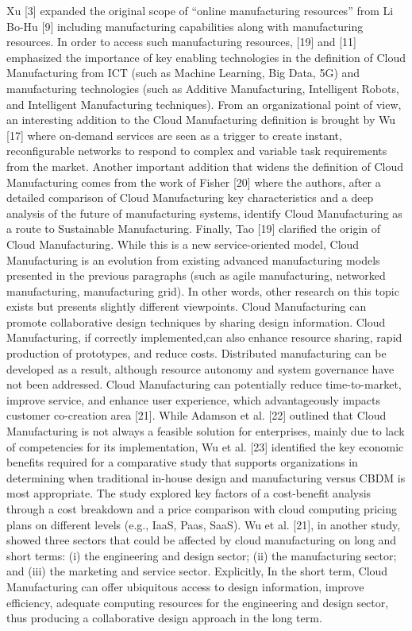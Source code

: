 Xu [3] expanded the original scope of “online manufacturing resources” from Li Bo-Hu [9] including manufacturing capabilities along with manufacturing resources. In order to access such manufacturing resources, [19] and [11] emphasized the importance of key enabling technologies in the definition of Cloud Manufacturing from ICT (such as Machine Learning, Big Data, 5G) and manufacturing technologies (such as Additive Manufacturing, Intelligent Robots, and Intelligent Manufacturing techniques). From an organizational point of view, an interesting addition to the Cloud Manufacturing definition is brought by Wu [17] where on-demand services are seen as a trigger to create instant, reconfigurable networks to respond to complex and variable task requirements from the market. Another important addition that widens the definition of Cloud Manufacturing comes from the work of Fisher [20] where the authors, after a detailed comparison of Cloud Manufacturing key characteristics and a deep analysis of the future of manufacturing systems, identify Cloud Manufacturing as a route to Sustainable Manufacturing. Finally, Tao [19] clarified the origin of Cloud Manufacturing. While this is a new service-oriented model, Cloud Manufacturing is an evolution from existing advanced manufacturing models presented in the previous paragraphs (such as agile manufacturing, networked manufacturing, manufacturing grid). In other words, other research on this topic exists but presents slightly different viewpoints. Cloud Manufacturing can promote collaborative design techniques by sharing design information. Cloud Manufacturing, if correctly implemented,can also enhance resource sharing, rapid production of prototypes, and reduce costs. Distributed manufacturing can be developed as a result, although resource autonomy and system governance have not been addressed. Cloud Manufacturing can potentially reduce time-to-market, improve service, and enhance user experience, which advantageously impacts customer co-creation area [21]. While Adamson et al. [22] outlined that Cloud Manufacturing is not always a feasible solution for enterprises, mainly due to lack of competencies for its implementation, Wu et al. [23] identified the key economic benefits required for a comparative study that supports organizations in determining when traditional in-house design and manufacturing versus CBDM is most appropriate. The study explored key factors of a cost-benefit analysis through a cost breakdown and a price comparison with cloud computing pricing plans on different levels (e.g., IaaS, Paas, SaaS). Wu et al. [21], in another study, showed three sectors that could be affected by cloud manufacturing on long and short terms: (i) the engineering and design sector; (ii) the manufacturing sector; and (iii) the marketing and service sector. Explicitly, In the short term, Cloud Manufacturing can offer ubiquitous access to design information, improve efficiency, adequate computing resources for the engineering and design sector, thus producing a collaborative design approach in the long term.\\
